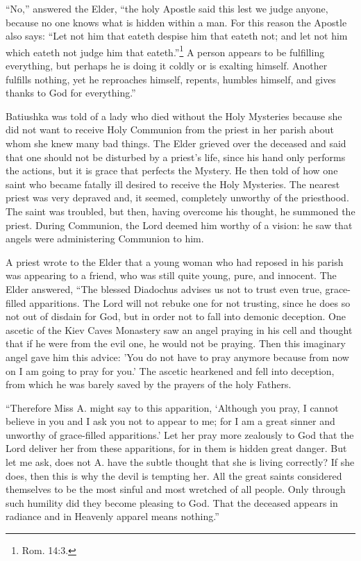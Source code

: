 “No,” answered the Elder, “the holy Apostle said this lest we judge anyone, because no one knows what is hidden within a man. For this reason the Apostle also says: “Let not him that eateth despise him that eateth not; and let not him which eateth not judge him that eateth.”\footnote{Rom. 14:3.} A person appears to be fulfilling everything, but perhaps he is doing it coldly or is exalting himself. Another fulfills nothing, yet he reproaches himself, repents, humbles himself, and gives thanks to God for everything.”

Batiushka was told of a lady who died without the Holy Mysteries because she did not want to receive Holy Communion from the priest in her parish about whom she knew many bad things. The Elder grieved over the deceased and said that one should not be disturbed by a priest's life, since his hand only performs the actions, but it is grace that perfects the Mystery. He then told of how one saint who became fatally ill desired to receive the Holy Mysteries. The nearest priest was very depraved and, it seemed, completely unworthy of the priesthood. The saint was troubled, but then, having overcome his thought, he summoned the priest. During Communion, the Lord deemed him worthy of a vision: he saw that angels were administering Communion to him.

A priest wrote to the Elder that a young woman who had reposed in his parish was appearing to a friend, who was still quite young, pure, and innocent. The Elder answered, “The blessed Diadochus advises us not to trust even true, grace-filled apparitions. The Lord will not rebuke one for not trusting, since he does so not out of disdain for God, but in order not to fall into demonic deception. One ascetic of the Kiev Caves Monastery saw an angel praying in his cell and thought that if he were from the evil one, he would not be praying. Then this imaginary angel gave him this advice: 'You do not have to pray anymore because from now on I am going to pray for you.' The ascetic hearkened and fell into deception, from which he was barely saved by the prayers of the holy Fathers.

“Therefore Miss A. might say to this apparition, ‘Although you pray, I cannot believe in you and I ask you not to appear to me; for I am a great sinner and unworthy of grace-filled apparitions.' Let her pray more zealously to God that the Lord deliver her from these apparitions, for in them is hidden great danger. But let me ask, does not A. have the subtle thought that she is living correctly? If she does, then this is why the devil is tempting her. All the great saints considered themselves to be the most sinful and most wretched of all people. Only through such humility did they become pleasing to God. That the deceased appears in radiance and in Heavenly apparel means nothing.”

